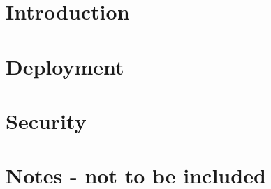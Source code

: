 \documentclass[a4paper]{article}
\begin{document}

\vfill


\newpage
\tableofcontents
\todototoc
\listoftodos
\newpage

\section{Introduction}%
\label{sec:introduction}



\section{Deployment}%
\label{sec:deployment}

\section{Security}%
\label{sec:security}




\newpage
\section*{Notes - not to be included}%
\label{sec:notes_not_to_be_included}



\end{document}
